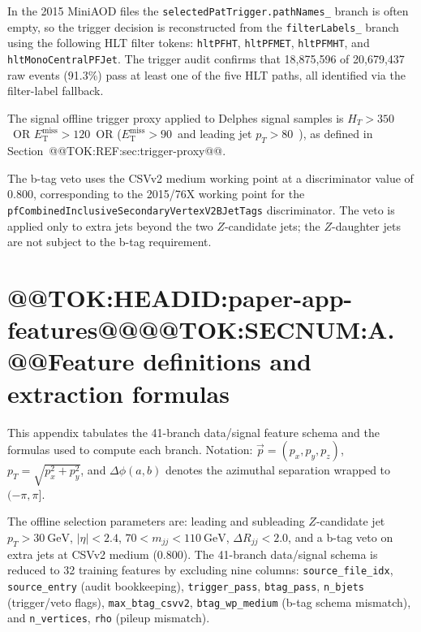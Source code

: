 \documentclass[11pt]{article}
\newcommand{\GeV}{\text{GeV}}
\newcommand{\MET}{\ensuremath{E_{\mathrm{T}}^{\mathrm{miss}}}}
\begin{document}
In the 2015 MiniAOD files the \texttt{selectedPatTrigger.pathNames\_} branch
is often empty, so the trigger decision is reconstructed from the
\texttt{filterLabels\_} branch using the following HLT filter tokens:
\texttt{hltPFHT}, \texttt{hltPFMET}, \texttt{hltPFMHT}, and
\texttt{hltMonoCentralPFJet}. The trigger audit confirms that
18{,}875{,}596 of 20{,}679{,}437 raw events (91.3\%) pass at least one of
the five HLT paths, all identified via the filter-label fallback.

The signal offline trigger proxy applied to Delphes signal samples is
$H_T>350$~\GeV OR $\MET>120$~\GeV OR ($\MET>90$~\GeV and leading jet
$p_T>80$~\GeV), as defined in Section~@@TOK:REF:sec:trigger-proxy@@.

The b-tag veto uses the CSVv2 medium working point at a discriminator value
of 0.800, corresponding to the 2015/76X working point for the
\texttt{pfCombinedInclusiveSecondaryVertexV2BJetTags} discriminator. The
veto is applied only to extra jets beyond the two $Z$-candidate jets; the
$Z$-daughter jets are not subject to the b-tag requirement.

\section{@@TOK:HEADID:paper-app-features@@@@TOK:SECNUM:A. @@Feature definitions and extraction formulas}

This appendix tabulates the 41-branch data/signal feature schema and the
formulas used to compute each branch. Notation: $\vec p = (p_x,p_y,p_z)$,
$p_T = \sqrt{p_x^2+p_y^2}$, and $\Delta\phi(a,b)$ denotes the azimuthal
separation wrapped to $(-\pi,\pi]$.

The offline selection parameters are: leading and subleading $Z$-candidate
jet $p_T > 30~\GeV$, $|\eta| < 2.4$, $70 < m_{jj} < 110~\GeV$,
$\Delta R_{jj} < 2.0$, and a b-tag veto on extra jets at CSVv2 medium
(0.800). The 41-branch data/signal schema is reduced to 32 training
features by excluding nine columns: \texttt{source\_file\_idx},
\texttt{source\_entry} (audit bookkeeping), \texttt{trigger\_pass},
\texttt{btag\_pass}, \texttt{n\_bjets} (trigger/veto flags),
\texttt{max\_btag\_csvv2}, \texttt{btag\_wp\_medium} (b-tag schema
mismatch), and \texttt{n\_vertices}, \texttt{rho} (pileup mismatch).
\end{document}
